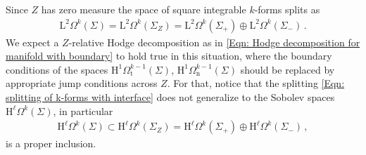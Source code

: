 Since $Z$ has zero measure the space of square integrable $k$-forms splits as
\begin{align}\label{Eqn: splitting of k-forms with interface}
	\mathrm{L}^2\Omega^k(\Sigma)=
	\mathrm{L}^2\Omega^k(\Sigma_Z)=
	\mathrm{L}^2\Omega^k(\Sigma_+)\oplus\mathrm{L}^2\Omega^k(\Sigma_-)\,.
\end{align}
We expect a $Z$-relative Hodge decomposition as in \eqref{Eqn: Hodge decomposition for manifold with boundary} to hold true in this situation, where the boundary conditions of the spaces $\mathrm{H}^1\Omega^{k-1}_{\mathrm{t}}(\Sigma)$, $\mathrm{H}^1\Omega^{k-1}_{\mathrm{n}}(\Sigma)$ should be replaced by appropriate jump conditions across $Z$.
For that, notice that the splitting \eqref{Eqn: splitting of k-forms with interface} does not generalize to the Sobolev spaces $\mathrm{H}^\ell\Omega^k(\Sigma)$, in particular
\begin{align}
	\mathrm{H}^\ell\Omega^k(\Sigma)\subset
	\mathrm{H}^\ell\Omega^k(\Sigma_Z)=
	\mathrm{H}^\ell\Omega^k(\Sigma_+)\oplus\mathrm{H}^\ell\Omega^k(\Sigma_-)\,,
\end{align}
is a proper inclusion.
\\

